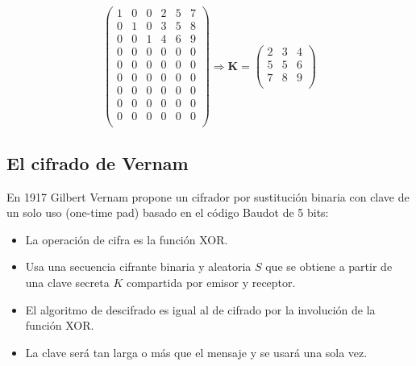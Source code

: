 \documentclass{article}
\begin{document}
\begin{equation*}
    \left(     \begin{array}{cccccc}
    1 & 0 & 0 & 2 & 5 & 7\\
    0 & 1 & 0 & 3 & 5 & 8\\
    0 & 0 & 1 & 4 & 6 & 9\\
    0 & 0 & 0 & 0 & 0 & 0\\
    0 & 0 & 0 & 0 & 0 & 0\\
    0 & 0 & 0 & 0 & 0 & 0\\
    0 & 0 & 0 & 0 & 0 & 0\\
    0 & 0 & 0 & 0 & 0 & 0\\
    0 & 0 & 0 & 0 & 0 & 0\\
    \end{array} \right) \Rightarrow \mathbf{K} = \left( \begin{array}{ccc}
    2 & 3 & 4\\
    5 & 5 & 6\\
    7 & 8 & 9\\
    \end{array} \right)
\end{equation*}


\subsection{El cifrado de Vernam}
\justify
En 1917 Gilbert Vernam propone un cifrador por sustitución binaria con clave de un solo uso (one-time pad) basado en el código Baudot de 5 bits:
\begin{itemize}
    \item[-] La operación de cifra es la función XOR.
    \item[-] Usa una secuencia cifrante binaria y aleatoria $S$ que se obtiene a partir de una clave secreta $K$ compartida por emisor y receptor. 
    \item[-] El algoritmo de descifrado es igual al de cifrado por la involución de la función XOR.
    \item[-] La clave será tan larga o más que el mensaje y se usará una sola vez. 
    
\end{itemize}
\end{document}
